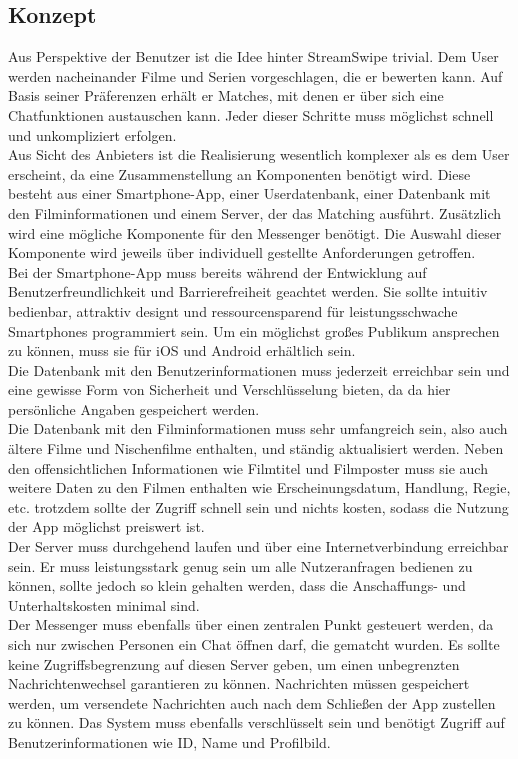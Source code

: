 
\subsection{Konzept}
Aus Perspektive der Benutzer ist die Idee hinter StreamSwipe trivial. Dem User werden nacheinander Filme und Serien vorgeschlagen, die er bewerten kann. Auf Basis seiner Präferenzen erhält er Matches, mit denen er über sich eine Chatfunktionen austauschen kann. Jeder dieser Schritte muss möglichst schnell und unkompliziert erfolgen.\\
Aus Sicht des Anbieters ist die Realisierung wesentlich komplexer als es dem User erscheint, da eine Zusammenstellung an Komponenten benötigt wird.  Diese besteht aus einer Smartphone-App, einer Userdatenbank, einer Datenbank mit den Filminformationen und einem Server, der das Matching ausführt. Zusätzlich wird eine mögliche Komponente für den Messenger benötigt. Die Auswahl dieser Komponente wird jeweils über individuell gestellte Anforderungen getroffen. \\

\noindent
Bei der Smartphone-App muss bereits während der Entwicklung auf Benutzerfreundlichkeit und Barrierefreiheit geachtet werden. Sie sollte intuitiv bedienbar, attraktiv designt und ressourcensparend für leistungsschwache Smartphones programmiert sein. Um ein möglichst großes Publikum ansprechen zu können, muss sie für iOS und Android erhältlich sein.\\
Die Datenbank mit den Benutzerinformationen muss jederzeit erreichbar sein und eine gewisse Form von Sicherheit und Verschlüsselung bieten, da da hier persönliche Angaben gespeichert werden.\\
Die Datenbank mit den Filminformationen  muss sehr umfangreich sein, also auch ältere Filme und Nischenfilme enthalten, und ständig aktualisiert werden. Neben den offensichtlichen Informationen wie Filmtitel und Filmposter muss sie auch weitere Daten zu den Filmen enthalten wie Erscheinungsdatum, Handlung, Regie, etc. trotzdem sollte der Zugriff schnell sein und nichts kosten, sodass die Nutzung der App möglichst preiswert ist.\\
Der Server muss durchgehend laufen und über eine Internetverbindung erreichbar sein. Er muss leistungsstark genug sein um alle Nutzeranfragen bedienen zu können, sollte jedoch so klein gehalten werden, dass die Anschaffungs- und Unterhaltskosten minimal sind.\\
Der Messenger  muss ebenfalls über einen zentralen Punkt gesteuert werden, da sich nur zwischen Personen ein Chat öffnen darf, die gematcht wurden. Es sollte keine Zugriffsbegrenzung auf diesen Server  geben, um einen unbegrenzten  Nachrichtenwechsel garantieren zu können. Nachrichten müssen gespeichert werden, um versendete Nachrichten auch nach dem Schließen der App zustellen zu können. Das System muss ebenfalls verschlüsselt sein und benötigt Zugriff auf Benutzerinformationen wie ID, Name und Profilbild. 



